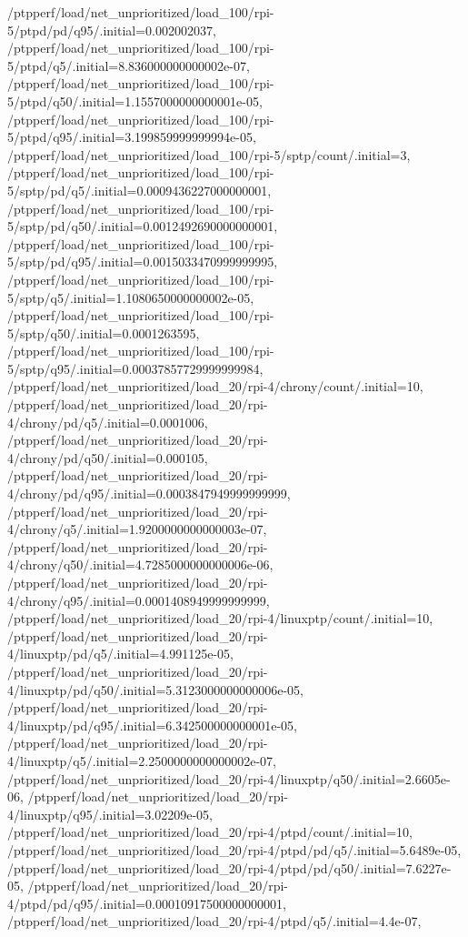 {    /ptpperf/load/net_unprioritized/load_100/rpi-5/ptpd/pd/q95/.initial=0.002002037,
    /ptpperf/load/net_unprioritized/load_100/rpi-5/ptpd/q5/.initial=8.836000000000002e-07,
    /ptpperf/load/net_unprioritized/load_100/rpi-5/ptpd/q50/.initial=1.1557000000000001e-05,
    /ptpperf/load/net_unprioritized/load_100/rpi-5/ptpd/q95/.initial=3.199859999999994e-05,
    /ptpperf/load/net_unprioritized/load_100/rpi-5/sptp/count/.initial=3,
    /ptpperf/load/net_unprioritized/load_100/rpi-5/sptp/pd/q5/.initial=0.0009436227000000001,
    /ptpperf/load/net_unprioritized/load_100/rpi-5/sptp/pd/q50/.initial=0.0012492690000000001,
    /ptpperf/load/net_unprioritized/load_100/rpi-5/sptp/pd/q95/.initial=0.0015033470999999995,
    /ptpperf/load/net_unprioritized/load_100/rpi-5/sptp/q5/.initial=1.1080650000000002e-05,
    /ptpperf/load/net_unprioritized/load_100/rpi-5/sptp/q50/.initial=0.0001263595,
    /ptpperf/load/net_unprioritized/load_100/rpi-5/sptp/q95/.initial=0.00037857729999999984,
    /ptpperf/load/net_unprioritized/load_20/rpi-4/chrony/count/.initial=10,
    /ptpperf/load/net_unprioritized/load_20/rpi-4/chrony/pd/q5/.initial=0.0001006,
    /ptpperf/load/net_unprioritized/load_20/rpi-4/chrony/pd/q50/.initial=0.000105,
    /ptpperf/load/net_unprioritized/load_20/rpi-4/chrony/pd/q95/.initial=0.0003847949999999999,
    /ptpperf/load/net_unprioritized/load_20/rpi-4/chrony/q5/.initial=1.9200000000000003e-07,
    /ptpperf/load/net_unprioritized/load_20/rpi-4/chrony/q50/.initial=4.7285000000000006e-06,
    /ptpperf/load/net_unprioritized/load_20/rpi-4/chrony/q95/.initial=0.0001408949999999999,
    /ptpperf/load/net_unprioritized/load_20/rpi-4/linuxptp/count/.initial=10,
    /ptpperf/load/net_unprioritized/load_20/rpi-4/linuxptp/pd/q5/.initial=4.991125e-05,
    /ptpperf/load/net_unprioritized/load_20/rpi-4/linuxptp/pd/q50/.initial=5.3123000000000006e-05,
    /ptpperf/load/net_unprioritized/load_20/rpi-4/linuxptp/pd/q95/.initial=6.342500000000001e-05,
    /ptpperf/load/net_unprioritized/load_20/rpi-4/linuxptp/q5/.initial=2.2500000000000002e-07,
    /ptpperf/load/net_unprioritized/load_20/rpi-4/linuxptp/q50/.initial=2.6605e-06,
    /ptpperf/load/net_unprioritized/load_20/rpi-4/linuxptp/q95/.initial=3.02209e-05,
    /ptpperf/load/net_unprioritized/load_20/rpi-4/ptpd/count/.initial=10,
    /ptpperf/load/net_unprioritized/load_20/rpi-4/ptpd/pd/q5/.initial=5.6489e-05,
    /ptpperf/load/net_unprioritized/load_20/rpi-4/ptpd/pd/q50/.initial=7.6227e-05,
    /ptpperf/load/net_unprioritized/load_20/rpi-4/ptpd/pd/q95/.initial=0.00010917500000000001,
    /ptpperf/load/net_unprioritized/load_20/rpi-4/ptpd/q5/.initial=4.4e-07,
}

